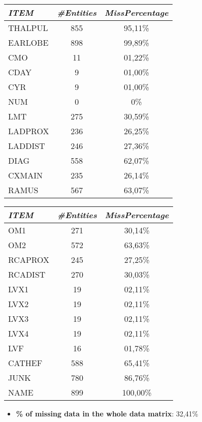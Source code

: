 \documentclass[a4paper,12pt]{article}
\begin{document}
        \begin{multicols}{2}

            \begin{tabular}{|l|c|c|} \hline

                \textit{ITEM} 	& \textit{\#Entities}	& \textit{MissPercentage} \\
                \hline THALPUL	&	855		&	95,11\% \\
                \hline EARLOBE	&	898		&	99,89\% \\
                \hline CMO		&	11	&	01,22\% \\
                \hline CDAY		&	9	&	01,00\% \\
                \hline CYR		&	9	&	01,00\% \\
                \hline NUM		&	0	&	0\% \\
                \hline LMT		&	275	&	30,59\% \\
                \hline LADPROX	&	236	&	26,25\% \\
                \hline LADDIST	&	246	&	27,36\% \\
                \hline DIAG		&	558	&	62,07\% \\
                \hline CXMAIN	&	235	&	26,14\% \\
                \hline RAMUS	&	567	&	63,07\% \\ \hline

            \end{tabular}

            \begin{tabular}{|l|c|c|} \hline

                \textit{ITEM} 	& \textit{\#Entities}	& \textit{MissPercentage} \\
                \hline OM1		&	271	&	30,14\% \\
                \hline OM2		&	572	&	63,63\% \\
                \hline RCAPROX	&	245	&	27,25\% \\
                \hline RCADIST	&	270	&	30,03\% \\
                \hline LVX1		&	19	&	02,11\% \\
                \hline LVX2		&	19	&	02,11\% \\
                \hline LVX3		&	19	&	02,11\% \\
                \hline LVX4		&	19	&	02,11\% \\
                \hline LVF		&	16	&	01,78\% \\
                \hline CATHEF	&	588	&	65,41\% \\
                \hline JUNK		&	780	&	86,76\% \\
                \hline NAME		&	899	&	100,00\% \\ \hline

            \end{tabular}
	\end{multicols}

    \begin{itemize}
        \item \textbf{\% of missing data in the whole data matrix}: 32,41\%

    \end{itemize}
\end{document}
